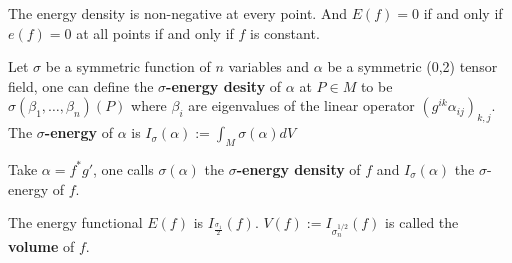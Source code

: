 \begin{remark}
The energy density is non-negative at every point. And \(E(f) = 0\) if and only if \(e(f)=0\) at all points if and only if \(f\) is constant.
\end{remark}

\begin{definition}
Let \(\sigma\) be a symmetric function of \(n\) variables and \(\alpha\) be a
symmetric (0,2) tensor field, one can define the \textbf{\(\sigma\)-energy desity} of \(\alpha\) at \(P\in M\) to be \(\sigma
(\beta_1,\dots,\beta_n)(P)\) where \(\beta_i\) are eigenvalues of the linear operator
\((g^{ik}\alpha_{ij})_{k,j}\). The \textbf{\(\sigma\)-energy} of \(\alpha\) is \(I_\sigma(\alpha)
:= \int_M  \sigma(\alpha) dV\)

Take \(\alpha = f^*g'\), one calls \(\sigma(\alpha)\) the \textbf{\(\sigma\)-energy density}
of \(f\) and \(I_\sigma(\alpha)\) the \(\sigma\)-energy of \(f\).
\end{definition}

\begin{exampl}
The energy functional \(E(f)\) is \(I_\frac{\sigma_1}{2}(f)\). \(V(f):=I_{\sigma^{1/2}_n}(f)\) is called the \textbf{volume} of \(f\).
\end{exampl}

